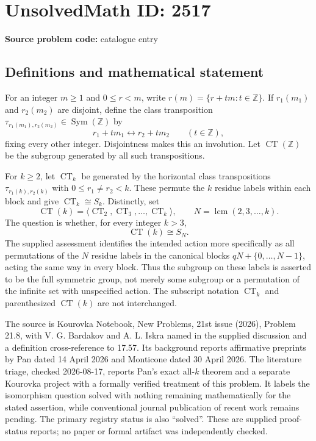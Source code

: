 \documentclass[11pt]{article}
\newcommand{\Z}{\mathbb{Z}}
\begin{document}
\section*{UnsolvedMath ID: 2517}
\textbf{Source problem code:} catalogue entry
\subsection{Definitions and mathematical statement}
For an integer $m\geq1$ and $0\leq r<m$, write $r(m)=\{r+tm:t\in\Z\}$. If $r_1(m_1)$ and $r_2(m_2)$ are disjoint, define the class transposition $\tau_{r_1(m_1),r_2(m_2)}\in\operatorname{Sym}(\Z)$ by
\[
r_1+tm_1\longleftrightarrow r_2+tm_2\qquad(t\in\Z),
\]
fixing every other integer. Disjointness makes this an involution. Let $\operatorname{CT}(\Z)$ be the subgroup generated by all such transpositions.

For $k\geq2$, let $\operatorname{CT}_k$ be generated by the horizontal class transpositions $\tau_{r_1(k),r_2(k)}$ with $0\leq r_1\ne r_2<k$. These permute the $k$ residue labels within each block and give $\operatorname{CT}_k\cong S_k$. Distinctly, set
\[
\operatorname{CT}(k)=\langle\operatorname{CT}_2,\operatorname{CT}_3,\ldots,\operatorname{CT}_k\rangle,
\qquad N=\operatorname{lcm}(2,3,\ldots,k).
\]
The question is whether, for every integer $k>3$,
\[
\operatorname{CT}(k)\cong S_N.
\]
The supplied assessment identifies the intended action more specifically as all permutations of the $N$ residue labels in the canonical blocks $qN+\{0,\ldots,N-1\}$, acting the same way in every block. Thus the subgroup on these labels is asserted to be the full symmetric group, not merely some subgroup or a permutation of the infinite set with unspecified action. The subscript notation $\operatorname{CT}_k$ and parenthesized $\operatorname{CT}(k)$ are not interchanged.

The source is Kourovka Notebook, New Problems, 21st issue (2026), Problem 21.8, with V. G. Bardakov and A. L. Iskra named in the supplied discussion and a definition cross-reference to 17.57. Its background reports affirmative preprints by Pan dated 14 April 2026 and Monticone dated 30 April 2026. The literature triage, checked 2026-08-17, reports Pan's exact all-$k$ theorem and a separate Kourovka project with a formally verified treatment of this problem. It labels the isomorphism question solved with nothing remaining mathematically for the stated assertion, while conventional journal publication of recent work remains pending. The primary registry status is also ``solved''. These are supplied proof-status reports; no paper or formal artifact was independently checked.
\end{document}
